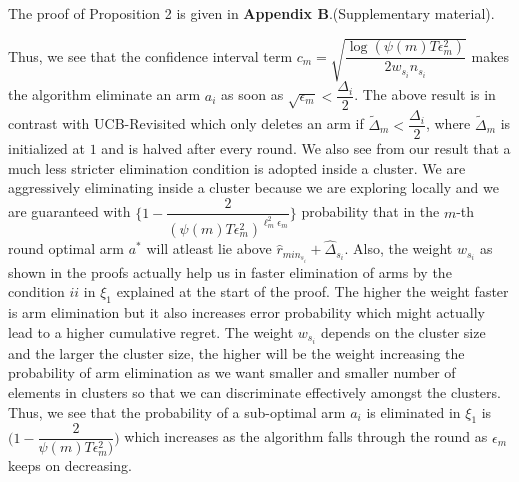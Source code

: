 	The proof of Proposition 2 is given in \textbf{Appendix B}.(Supplementary material).

\begin{remark}
	
	Thus, we see that the confidence interval term $c_{m}=\sqrt{\dfrac{\log (\psi(m)T\epsilon_{m}^{2})}{2w_{s_{i}} n_{s_{i}}}}$ makes the algorithm eliminate an arm $a_{i}$ as soon as $\sqrt{\epsilon_{m}}<\dfrac{\Delta_{i}}{2}$. The above result is in contrast with UCB-Revisited which only deletes an arm if $\tilde{\Delta}_{m}<\dfrac{\Delta_{i}}{2}$, where $\tilde{\Delta}_{m}$ is initialized at $1$ and is halved after every round. We also see from our result that a much less stricter elimination condition is adopted inside a cluster. We are aggressively eliminating inside a cluster because we are exploring locally and we are guaranteed with  $\bigg\lbrace 1- \dfrac{2}{(\psi(m)T\epsilon_{m}^{2})^{\ell_{m}^{2}\epsilon_{m}}} \bigg\rbrace$ probability that in the $m$-th round optimal arm $a^{*}$ will atleast lie above $\hat{r}_{min_{s_{i}}}+ \hat{\Delta}_{s_{i}}$. Also, the weight $w_{s_{i}}$ as shown in the proofs actually help us in faster elimination of arms by the condition $ii$ in $\xi_
{1}$ explained at the start of the proof. The higher the weight faster is arm elimination but it also increases error probability which might actually lead to a higher cumulative regret. The weight $w_{s_{i}}$ depends on the cluster size and the larger the cluster size, the higher will be the weight increasing the probability of arm elimination as we want smaller and smaller number of elements in clusters so that we can discriminate effectively amongst the clusters.
%
%
%
%
	Thus, we see that the probability of a sub-optimal arm $a_{i}$ is eliminated in $\xi_{1}$ is  $\bigg(1-\dfrac{2}{\psi(m)T\epsilon_{m}^{2})}\bigg)$ which increases as the algorithm falls through the round as $\epsilon_{m}$ keeps on decreasing.
	

\end{remark}
